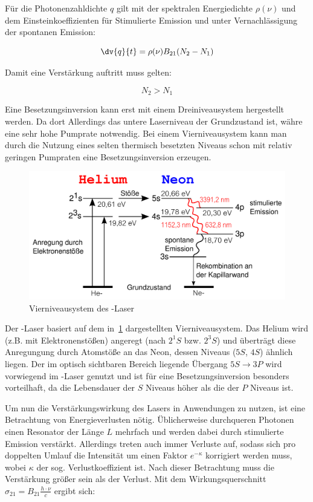 \documentclass[slug=GL, room=HZDR\ Dresden/Rossendorf\,\ Geb.\ 620/123, supervisor=Martin\ Rehwald;\, Tim\ Ziegler]{../../Lab_Report_LaTeX/lab_report}
\newcommand{\hne}{\ce{HeNe}-Laser}
\begin{document}
F\"ur die Photonenzahldichte \(q\) gilt mit der spektralen
Energiedichte \(\rho(\nu)\) und dem Einsteinkoeffizienten f\"ur
Stimulierte Emission und unter Vernachl\"assigung der spontanen
Emission:

\begin{equation}
  \label{eq:qrate}
  \dv{q}{t}=\rho(\nu)B_{21}(N_2-N_1)
\end{equation}

Damit eine Verst\"arkung auftritt muss gelten:

\begin{equation}
  \label{eq:first}
  \tag{Erste Laserbedingung}
  N_2>N_1
\end{equation}

Eine Besetzungsinversion kann erst mit einem Dreiniveausystem
hergestellt werden. Da dort Allerdings das untere Laserniveau der
Grundzustand ist, w\"ahre eine sehr hohe Pumprate notwendig. Bei einem
Vierniveausystem kann man durch die Nutzung eines selten thermisch
besetzten Niveaus schon mit relativ geringen Pumpraten eine
Besetzungsinversion erzeugen.

\begin{figure}[H]\centering
  \includegraphics[width=.8\columnwidth]{heneniv.png}
  \caption[Aufbau]{Vierniveausystem des \hne{}}
  \label{fig:niveaus}
\end{figure}

Der \hne{} basiert auf dem in~\ref{fig:niveaus} dargestellten
Vierniveausystem. Das Helium wird (z.B. mit Elektronenst\"o\ss{}en)
angeregt (nach \(2^1S\) bzw. \(2^3S\)) und \"ubertr\"agt diese
Anregungung durch Atomst\"o\ss{}e an das Neon, dessen Niveaus (\(5S\),
\(4S\)) \"ahnlich liegen. Der im optisch sichtbaren Bereich liegende
\"Ubergang \(5S\rightarrow 3P\) wird vorwiegend im \hne{} genutzt und
ist f\"ur eine Besetzungsinversion besonders vorteilhaft, da die
Lebensdauer der \(S\) Niveaus h\"oher als die der \(P\) Niveaus ist.


Um nun die Verst\"arkungswirkung des Lasers in Anwendungen zu nutzen,
ist eine Betrachtung von Energieverlusten n\"otig. \"Ublicherweise
durchqueren Photonen einen Resonator der L\"ange \(L\) mehrfach und
werden dabei durch stimulierte Emission verst\"arkt. Allerdings treten
auch immer Verluste auf, sodass sich pro doppelten Umlauf die
Intensit\"at um einen Faktor \(e^{-\kappa}\) korrigiert werden muss,
wobei \(\kappa\) der sog. Verlustkoeffizient ist. Nach dieser
Betrachtung muss die Verst\"arkung gr\"o\ss{}er sein als der Verlust.
Mit dem Wirkungsquerschnitt \(\sigma_{21}=B_{21}\frac{h\cdot\nu}{c}\)
ergibt sich:
\end{document}
